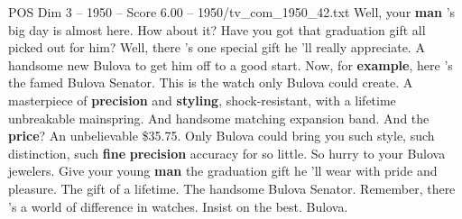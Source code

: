 \begin{textsample}{POS Dim 3 – 1950 – Score 6.00 – 1950/tv\_com\_1950\_42.txt}  \label{ex:f3_pos_007}
Well, your \textbf{man} 's big day is almost here.
How about it?
Have you got that graduation gift all picked out for him?
Well, there 's one special gift he 'll really appreciate.
A handsome new Bulova to get him off to a good start.
Now, for \textbf{example}, here 's the famed Bulova Senator.
This is the watch only Bulova could create.
A masterpiece of \textbf{precision} and \textbf{styling}, shock-resistant, with a lifetime unbreakable mainspring.
And handsome matching expansion band.
And the \textbf{price}?
An unbelievable \$35.75.
Only Bulova could bring you such style, such distinction, such \textbf{fine} \textbf{precision} accuracy for so little.
So hurry to your Bulova jewelers.
Give your young \textbf{man} the graduation gift he 'll wear with pride and pleasure.
The gift of a lifetime.
The handsome Bulova Senator.
Remember, there 's a world of difference in watches.
Insist on the best.
Bulova.

\end{textsample}
